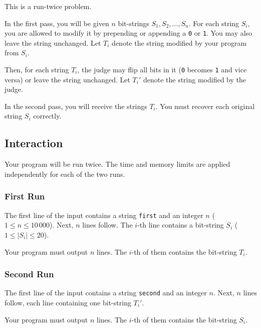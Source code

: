 
This is a run-twice problem.

In the first pass, you will be given $n$ bit-strings $S_1, S_2, \ldots, S_n$.
For each string $S_i$, you are allowed to modify it by prepending or appending a \texttt{0} or \texttt{1}.
You may also leave the string unchanged.
Let $T_i$ denote the string modified by your program from $S_i$.

Then, for each string $T_i$, the judge may flip all bits in it (\texttt{0} becomes \texttt{1} and vice versa) or leave the string unchanged.
Let $T_i'$ denote the string modified by the judge.

In the second pass, you will receive the strings $T_i$.
You must recover each original string $S_i$ correctly.

\subsection*{Interaction}

Your program will be run twice. The time and memory limits are applied independently for each of the two runs.

\subsubsection*{First Run}

The first line of the input contains a string \texttt{first} and an integer $n$ ($1 \leq n \leq 10\,000$).
Next, $n$ lines follow.
The $i$-th line contains a bit-string $S_i$ ($1 \leq |S_i| \leq 20$).

Your program must output $n$ lines.
The $i$-th of them contains the bit-string $T_i$.

\subsubsection*{Second Run}

The first line of the input contains a string \texttt{second} and an integer $n$.
Next, $n$ lines follow, each line containing one bit-string $T_i'$.

Your program must output $n$ lines.
The $i$-th of them contains the bit-string $S_i$.
